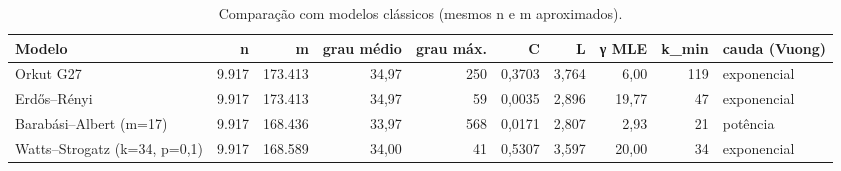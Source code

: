 \begin{table}[ht]
\centering
\caption{Comparação com modelos clássicos (mesmos n e m aproximados).}
\label{tab:modelos}
\small
\begin{tabular}{lrrrrrrrrl}
\hline
Modelo & n & m & grau médio & grau máx. & C & L & γ MLE & k\_min & cauda (Vuong) \\
\hline
Orkut G27 & 9.917 & 173.413 & 34,97 & 250 & 0,3703 & 3,764 & 6,00 & 119 & exponencial \\
Erdős–Rényi & 9.917 & 173.413 & 34,97 & 59 & 0,0035 & 2,896 & 19,77 & 47 & exponencial \\
Barabási–Albert (m=17) & 9.917 & 168.436 & 33,97 & 568 & 0,0171 & 2,807 & 2,93 & 21 & potência \\
Watts–Strogatz (k=34, p=0,1) & 9.917 & 168.589 & 34,00 & 41 & 0,5307 & 3,597 & 20,00 & 34 & exponencial \\
\hline
\end{tabular}
\end{table}

